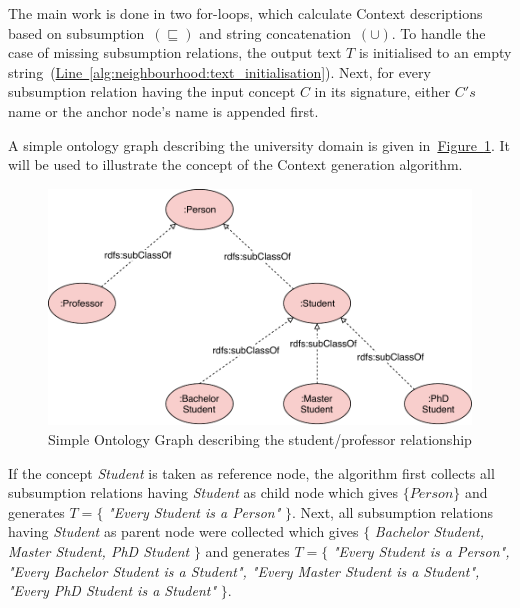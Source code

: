 The main work is done in two for-loops, which calculate Context descriptions based on subsumption~$(\sqsubseteq)$ and string concatenation~$(\cup)$. To handle the case of missing subsumption relations, the output text $T$ is initialised to an empty string~(\hyperref[alg:neighbourhood:text_initialisation]{Line~\ref*{alg:neighbourhood:text_initialisation}}). Next, for every subsumption relation having the input concept $C$ in its signature, either $C's$ name or the anchor node's name is appended first.

A simple ontology graph describing the university domain is given in~\hyperref[fig:simple_owl_graph]{Figure~\ref*{fig:simple_owl_graph}}. It will
be used to illustrate the concept of the Context generation algorithm.
\begin{figure}
	 \centering
	 \includegraphics[width=\textwidth]{drawio/University_Ontology_Example-Professor-Student}
	 \caption{Simple Ontology Graph describing the student/professor relationship}\label{fig:simple_owl_graph}
\end{figure}
If the concept \emph{Student} is taken as reference node, the algorithm first collects all subsumption relations having \emph{Student} as child node which gives $\{Person\}$ and generates $T=\{$ \emph{"Every Student is a Person"} $\}$. Next, all subsumption relations having \emph{Student} as parent node were collected which gives $\{$ \emph{Bachelor Student, Master Student, PhD Student} $\}$ and generates $T=\{$ \emph{"Every Student is a Person", "Every Bachelor Student is a Student", "Every Master Student is a Student", "Every PhD Student is a Student"} $\}$. 

